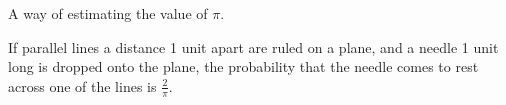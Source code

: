 A way of estimating the value of $ \pi . $
\par
If parallel lines a distance 1 unit apart are
ruled on a plane, and a needle 1 unit long is
dropped onto the plane, the probability
that the needle comes to rest across one of
the lines is $ \frac{2}{\pi}. $